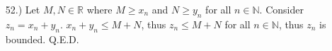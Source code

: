 \documentclass[12pt]{article}
\newcommand{\vertb}[1]{\left\vert#1\right\vert}
\newcommand{\e}{\varepsilon}
\begin{document}
\begin{itemize}



    \item [52.)] Let $M,N\in\mathbb{R}$ where $M\geq x_n$ and $N\geq y_n$ for all $n\in\mathbb{N}$. Consider $z_n=x_n+y_n$. $x_n+y_n\leq M+N$, thus $z_n\leq M+N$ for all $n\in\mathbb{N}$, thus $z_n$ is bounded. Q.E.D.









\end{itemize}
\end{document}
